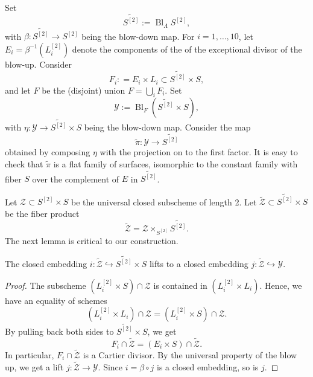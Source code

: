 \documentclass[11pt,reqno, letterpaper]{amsart}
\DeclareMathOperator{\Bl}{Bl}
\renewcommand{\to}{{\longrightarrow}}
\numberwithin{equation}{section}
\begin{document}
Set
\begin{equation}
  \label{eq:S2tilde}
  \widetilde {S^{[2]}} := \Bl_{\Lambda}S^{[2]},
\end{equation}
with $\beta \colon \widetilde {S^{[2]}} \to S^{[2]}$ being the blow-down map.
For $i=1, \dots, 10$, let $E_{i} = \beta^{-1}(L^{[2]}_{i})$ denote the
components of the of the exceptional divisor of the blow-up.
Consider
\[ F_i: = E_i \times L_i \subset \widetilde {S^{[2]}} \times S,\]
and let $F$ be the (disjoint) union $F = \bigcup_i F_i$.
Set
\begin{equation}
  \label{eq:Xtilde}
  \mathcal{Y} := \Bl_{F}\left( \widetilde{S^{[2]}} \times S \right),
\end{equation}
with $\eta \colon \mathcal Y \to  \widetilde{S^{[2]}} \times S$ being the blow-down map.
Consider the map
\[ \widetilde \pi \colon \mathcal Y \to \widetilde {S^{[2]}}\]
obtained by composing $\eta$ with the projection on to the first factor.
It is easy to check that $\widetilde \pi$ is a flat family of surfaces, isomorphic to the constant family with fiber $S$ over the complement of $E$ in $\widetilde{S^{[2]}}$.

Let $\mathcal Z \subset S^{[2]} \times S$ be the universal closed subscheme of length 2.
Let $\widetilde {\mathcal Z} \subset \widetilde{S^{[2]}} \times S$ be the fiber product
\[ \widetilde {\mathcal Z} = \mathcal Z \times_{S^{[2]}} \widetilde {S^{[2]}}.\]
The next lemma is critical to our construction.
\begin{lemma}
  The closed embedding
  $i: \widetilde{\mathcal{Z}} \hookrightarrow \widetilde{S^{[2]}}
  \times S$ lifts to a closed embedding
  $j: \widetilde{\mathcal{Z}} \hookrightarrow  \mathcal{Y}$.
\end{lemma}
\begin{proof}
  The subscheme $(L^{[2]}_i \times S) \cap \mathcal Z$ is contained in $(L^{[2]}_i \times L_i)$.
  Hence, we have an equality of schemes
  \[
    (L^{[2]}_i \times L_i) \cap \mathcal Z = (L^{[2]}_i \times S) \cap \mathcal Z.
  \]
  By pulling back both sides to $\widetilde{S^{[2]}} \times S$, we get
  \begin{equation}
    \label{eq:Cartier}
    F_i \cap \widetilde{\mathcal{Z}} = (E_i \times S) \cap \widetilde{\mathcal{Z}}.
  \end{equation}
  In particular, $F_i \cap \widetilde {\mathcal Z}$ is a Cartier divisor.
  By the universal property of the blow up, we get a lift $j \colon \widetilde{\mathcal Z} \to \mathcal Y$.
  Since $i = \beta \circ j$ is a closed embedding, so is $j$.
\end{proof}
\end{document}

